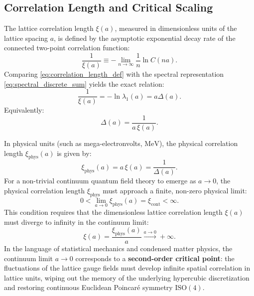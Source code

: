 \subsection{Correlation Length and Critical Scaling}
\label{subsec:correlation_critical_scaling}

The lattice correlation length $\xi(a)$, measured in dimensionless units of the lattice spacing $a$, is defined by the asymptotic exponential decay rate of the connected two-point correlation function:
\begin{equation}
\label{eq:correlation_length_def}
\frac{1}{\xi(a)} \equiv -\lim_{n \to \infty} \frac{1}{n} \ln C(n a).
\end{equation}
Comparing \eqref{eq:correlation_length_def} with the spectral representation \eqref{eq:spectral_discrete_sum} yields the exact relation:
\begin{equation}
\label{eq:xi_gap_relation}
\frac{1}{\xi(a)} = -\ln \lambda_1(a) = a \Delta(a).
\end{equation}
Equivalently:
\begin{equation}
\label{eq:gap_xi_inverse}
\Delta(a) = \frac{1}{a \, \xi(a)}.
\end{equation}

In physical units (such as mega-electronvolts, $\mathrm{MeV}$), the physical correlation length $\xi_{\mathrm{phys}}(a)$ is given by:
\begin{equation}
\label{eq:xi_phys_def}
\xi_{\mathrm{phys}}(a) = a \, \xi(a) = \frac{1}{\Delta(a)}.
\end{equation}
For a non-trivial continuum quantum field theory to emerge as $a \to 0$, the physical correlation length $\xi_{\mathrm{phys}}$ must approach a finite, non-zero physical limit:
\begin{equation}
\label{eq:finite_xi_phys}
0 < \lim_{a \to 0} \xi_{\mathrm{phys}}(a) = \xi_{\mathrm{cont}} < \infty.
\end{equation}
This condition requires that the dimensionless lattice correlation length $\xi(a)$ must diverge to infinity in the continuum limit:
\begin{equation}
\label{eq:xi_divergence}
\xi(a) = \frac{\xi_{\mathrm{phys}}(a)}{a} \xrightarrow{a \to 0} +\infty.
\end{equation}
In the language of statistical mechanics and condensed matter physics, the continuum limit $a \to 0$ corresponds to a \textbf{second-order critical point}: the fluctuations of the lattice gauge fields must develop infinite spatial correlation in lattice units, wiping out the memory of the underlying hypercubic discretization and restoring continuous Euclidean Poincaré symmetry $\mathrm{ISO}(4)$.

